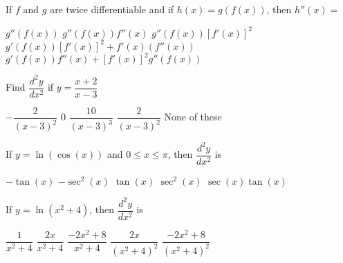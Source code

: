 \begin{questions}
    \question If $f$ and $g$ are twice differentiable and if $h(x) = g\left(f(x)\right)$, then $h''(x) = $ \\

    \begin{oneparchoices}
        \choice $g''\left(f(x)\right)$ 
        \choice $g''\left(f(x)\right)f''(x)$ 
        \choice $g''\left(f(x)\right)\left[f'(x)\right]^2$ \\[11pt]
        \makebox[0.07\textwidth] \choice $g'\left(f(x)\right)\left[f'(x)\right]^2 + f'(x)\left(f''(x)\right)$ 
        \makebox[0.13\textwidth] \choice $g'\left(f(x)\right)f''(x) + \left[f'(x)\right]^2g''\left(f(x)\right)$ 
    \end{oneparchoices} \par \horizontalline

    \question Find $\dfrac{d^2y}{dx^2}$ if $y = \dfrac{x + 2}{x - 3}$ \\

    \begin{oneparchoices}
        \choice $-\dfrac{2}{(x - 3)^2}$
        \choice $0$
        \choice $\dfrac{10}{(x - 3)^3}$
        \choice $\dfrac{2}{(x - 3)^2}$
        \choice None of these
    \end{oneparchoices} \par \horizontalline

    \question If $y = \ln (\cos (x))$ and $0 \leq x \leq \pi$, then $\dfrac{d^2y}{dx^2}$ is \\

    \begin{oneparchoices}
        \choice $-\tan (x)$
        \choice $-\sec^2 (x)$
        \choice $\tan (x)$
        \choice $\sec^2 (x)$
        \choice $\sec (x)\tan (x)$
    \end{oneparchoices} \par \horizontalline

    \question If $y = \ln \left(x^2 + 4\right)$, then $\dfrac{d^2y}{dx^2}$ is \\

    \begin{oneparchoices}
        \choice $\dfrac{1}{x^2 + 4}$ 
        \choice $\dfrac{2x}{x^2 + 4}$
        \choice $\dfrac{-2x^2 + 8}{x^2 + 4}$
        \choice $\dfrac{2x}{\left(x^2 + 4\right)^2}$
        \choice $\dfrac{-2x^2 + 8}{\left(x^2 + 4\right)^2}$
    \end{oneparchoices} \par \horizontalline


\end{questions}
